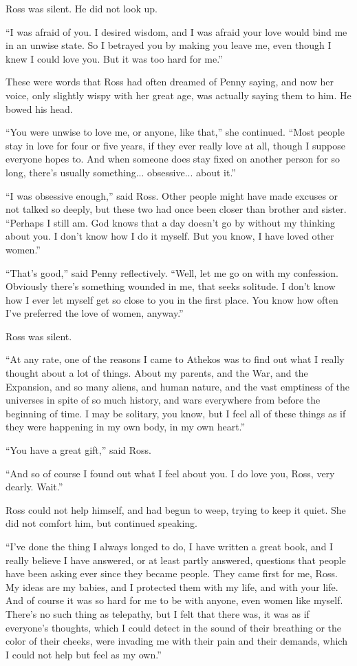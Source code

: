 \documentclass[english,11pt,letterpaper,onecolumn]{scrbook}
\begin{document}
	Ross was silent.  He did not look up.

	``I was afraid of you.  I desired wisdom, and I was afraid your love would bind me in an unwise state.  So I betrayed you by making you leave me, even though I knew I could love you.  But it was too hard for me.''

	These were words that Ross had often dreamed of Penny saying, and now her voice, only slightly wispy with her great age, was actually saying them to him.  He bowed his head.

	``You were unwise to love me, or anyone, like that,'' she continued.  ``Most people stay in love for four or five years, if they ever really love at all, though I suppose everyone hopes to.  And when someone does stay fixed on another person for so long, there's usually something... obsessive... about it.''

	``I was obsessive enough,'' said Ross.  Other people might have made excuses or not talked so deeply, but these two had once been closer than brother and sister.  ``Perhaps I still am.  God knows that a day doesn't go by without my thinking about you.  I don't know how I do it myself.  But you know, I have loved other women.''

	``That's good,'' said Penny reflectively.  ``Well, let me go on with my confession.  Obviously there's something wounded in me, that seeks solitude.  I don't know how I ever let myself get so close to you in the first place.  You know how often I've preferred the love of women, anyway.''

	Ross was silent.

	``At any rate, one of the reasons I came to Athekos was to find out what I really thought about a lot of things.  About my parents, and the War, and the Expansion, and so many aliens, and human nature, and the vast emptiness of the universes in spite of so much history, and wars everywhere from before the beginning of time.  I may be solitary, you know, but I feel all of these things as if they were happening in my own body, in my own heart.''

	``You have a great gift,'' said Ross.

	``And so of course I found out what I feel about you.  I do love you, Ross, very dearly.  Wait.''

	Ross could not help himself, and had begun to weep, trying to keep it quiet.  She did not comfort him, but continued speaking.

	``I've done the thing I always longed to do, I have written a great book, and I really believe I have answered, or at least partly answered, questions that people have been asking ever since they became people.  They came first for me, Ross.  My ideas are my babies, and I protected them with my life, and with your life.  And of course it was so hard for me to be with anyone, even women like myself.  There's no such thing as telepathy, but I felt that there was, it was as if everyone's thoughts, which I could detect in the sound of their breathing or the color of their cheeks, were invading me with their pain and their demands, which I could not help but feel as my own.''
\end{document}
